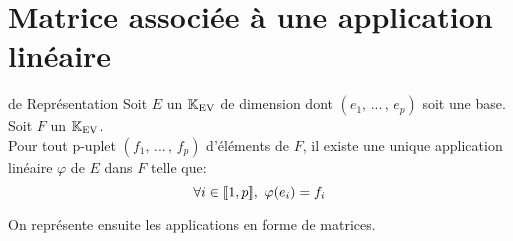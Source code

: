 \documentclass[12pt,twoside,a4paper]{article}
\author{MPSI 2}
\begin{document}
	\maketitle
	\section{Matrice associée \`a une application linéaire}
		\begin{theo}{de Représentation}
			Soit $E$ un $\mathbb{K}_\mathrm{EV}$ de dimension dont $(e_1,\,...\,,\,e_p)$ soit une base.\\
			Soit $F$ un $\mathbb{K}_\mathrm{EV}$.\\
			Pour tout p-uplet $(f_1,\,...\,,\,f_p)$ d'éléments de $F$, il existe une unique application linéaire $\varphi$ de $E$ dans $F$ telle que:
			$$\forall i\in[\![ 1,p ]\!],\ \varphi(e_i)=f_i $$
		\end{theo}
		\begin{flushleft}
			On représente ensuite les applications en forme de matrices.
		\end{flushleft}
\end{document}
